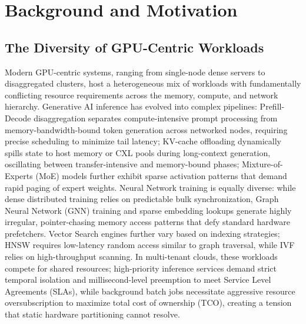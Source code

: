 \section{Background and Motivation}

\subsection{The Diversity of GPU-Centric Workloads}

Modern GPU-centric systems, ranging from single-node dense servers to disaggregated clusters, host a heterogeneous mix of workloads with fundamentally conflicting resource requirements across the memory, compute, and network hierarchy. Generative AI inference has evolved into complex pipelines: Prefill-Decode disaggregation separates compute-intensive prompt processing from memory-bandwidth-bound token generation across networked nodes, requiring precise scheduling to minimize tail latency; KV-cache offloading dynamically spills state to host memory or CXL pools during long-context generation, oscillating between transfer-intensive and memory-bound phases; Mixture-of-Experts (MoE) models further exhibit sparse activation patterns that demand rapid paging of expert weights. Neural Network training is equally diverse: while dense distributed training relies on predictable bulk synchronization, Graph Neural Network (GNN) training and sparse embedding lookups generate highly irregular, pointer-chasing memory access patterns that defy standard hardware prefetchers. Vector Search engines further vary based on indexing strategies; HNSW requires low-latency random access similar to graph traversal, while IVF relies on high-throughput scanning.
In multi-tenant clouds, these workloads compete for shared resources; high-priority inference services demand strict temporal isolation and millisecond-level preemption to meet Service Level Agreements (SLAs), while background batch jobs necessitate aggressive resource oversubscription to maximize total cost of ownership (TCO), creating a tension that static hardware partitioning cannot resolve.

